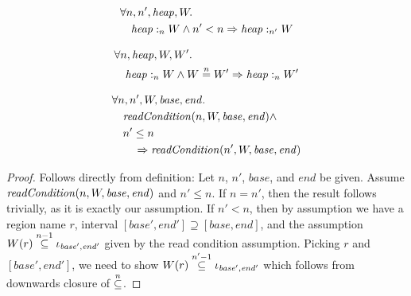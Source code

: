 \documentclass{article}
\newcommand{\nequal}[1][n]{\stackrel{\tiny{#1}}{=}}
\newcommand{\nsubeq}[1][n]{\stackrel{\tiny{#1}}{\subseteq}}
\newcommand{\var}[1]{\mathit{#1}}
\newcommand{\start}{\var{base}}
\newcommand{\addrend}{\var{end}}
\newcommand{\heap}{\var{heap}}
\newcommand{\plainfun}[2]{
  \ifthenelse{\equal{#2}{}}
             {\mathit{#1}}
             {\mathit{#1}(#2)}
}
\newcommand{\readCond}[1]{\plainfun{readCondition}{#1}}
\newcommand{\heapSat}[3][\heap]{#1 :_{#2} #3}
\begin{document}
\begin{lemma}
  \begin{align*}
    & \forall n,n',\heap, W \ldotp\\
    & \quad \heapSat{n}{W} \land n' < n \Rightarrow \heapSat{n'}{W}
  \end{align*}
\end{lemma}

\begin{lemma}
  \begin{align*}
    & \forall n,\heap, W, W' \ldotp\\
    & \quad \heapSat{n}{W} \land W \nequal W' \Rightarrow \heapSat{n}{W'}
  \end{align*}
\end{lemma}

\begin{lemma}
  \begin{align*}
    &\forall n,n',W,\start, \addrend \ldotp \\
    &\quad  \readCond{n,W,\start,\addrend} \land \\
    &\quad  n' \leq n \\
    &\qquad \Rightarrow \readCond{n',W,\start,\addrend}
  \end{align*}
\end{lemma}
\begin{proof}
  Follows directly from definition: Let $n$, $n'$, $\start$, and  $\addrend$ be given. Assume $\readCond{n,W,\start,\addrend}$ and $n' \leq n$. If $n=n'$, then the result follows trivially, as it is exactly our assumption. If $n' < n$, then by assumption we have a region name $r$, interval $[\start',\addrend'] \supseteq [\start,\addrend]$, and the assumption $W(r) \nsubeq[n-1] \iota_{\start',\addrend'}$  given by the read condition assumption. Picking $r$ and $[\start',\addrend']$, we need to show  $W(r) \nsubeq[n'-1] \iota_{\start',\addrend'}$ which follows from downwards closure of $\nsubeq$.
\end{proof}
\end{document}
